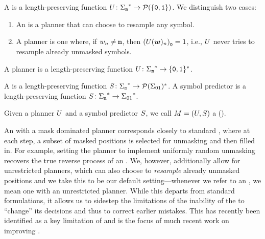 \begin{definition}[Planner]
   A  is a length-preserving function ${U}\colon {{{{{\Sigma}}_{{\texttt{m}}}}^{*}}} \to {{\mathcal{P}}}(\{{\texttt{0}}, {\texttt{1}}\})$.
   We distinguish two cases:
   \begin{enumerate}[label=\textbf{Case \arabic*:},leftmargin=*]
      \item An  is a planner that can choose to resample any symbol.
      \item A  planner is one where, if ${{w}}_{{n}} \neq {\texttt{m}}$, then $\mleft(\planner(\str)_\stridx\mright)_{\rejectSym} = 1$, i.e., ${U}$ never tries to resample already unmasked symbols.
   \end{enumerate} 
   A  planner is a length-preserving function ${U}\colon {{{{{\Sigma}}_{{\texttt{m}}}}^{*}}} \to {{\{{\texttt{0}}, {\texttt{1}}\}^{*}}}$.
\end{definition}

\begin{definition}
   A  is a length-preserving function ${S}\colon {{{{{\Sigma}}_{{\texttt{m}}}}^{*}}} \to {{{{\mathcal{P}}}({{{\Sigma}}_{01}})^{*}}}$.
   A  symbol predictor is a length-preserving function ${S}\colon {{{{{\Sigma}}_{{\texttt{m}}}}^{*}}} \to {{{{{\Sigma}}_{01}}^{*}}}$.
\end{definition}

\begin{definition}
   Given a planner ${U}$ and a symbol predictor ${S}$, we call ${M} = ({U}, {S})$ a  (\MDMAcr).
\end{definition}

An \MDMAcr with a mask dominated planner corresponds closely to standard \MDMsAcr, where at each step, a subset of masked positions is selected for unmasking and then filled in.
For example, setting the planner to implement uniformly random unmasking recovers the true reverse process of an \MDMAcr.
We, however, additionally allow for unrestricted planners, which can also choose to \emph{resample} already unmasked positions and we take this to be our default setting---whenever we refer to an \MDMAcr, we mean one with an unrestricted planner.
While this departs from standard \MDMAcr formulations, it allows us to sidestep the limitations of the inability of the \MDMAcr to ``change'' its decisions and thus to correct earlier mistakes.
This has recently been identified as a key limitation of \MDMsAcr and is the focus of much recent work on improving \MDMsAcr \citep[][\textit{inter alia}]{rutte2025generalized,song2025seeddiffusionlargescalediffusion}.

